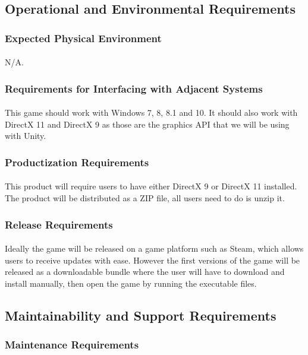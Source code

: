 \documentclass[12pt, titlepage]{article}
\begin{document}
\subsection{Operational and Environmental Requirements}
\subsubsection{Expected Physical Environment}
\paragraph{}N/A.
\subsubsection{Requirements for Interfacing with Adjacent Systems}
\paragraph{}This game should work with Windows 7, 8, 8.1 and 10. It should also work with DirectX 11 and DirectX 9 as those are the graphics API that we will be using with Unity. 
\subsubsection{Productization Requirements}
\paragraph{}This product will require users to have either DirectX 9 or DirectX 11 installed. The product will be distributed as a ZIP file, all users need to do is unzip it.
\subsubsection{Release Requirements}
\paragraph{}Ideally the game will be released on a game platform such as Steam, which allows users to receive updates with ease. However the first versions of the game will be released as a downloadable bundle where the user will have to download and install manually, then open the game by running the executable files. 
\subsection{Maintainability and Support Requirements}
\subsubsection{Maintenance Requirements}
\end{document}
